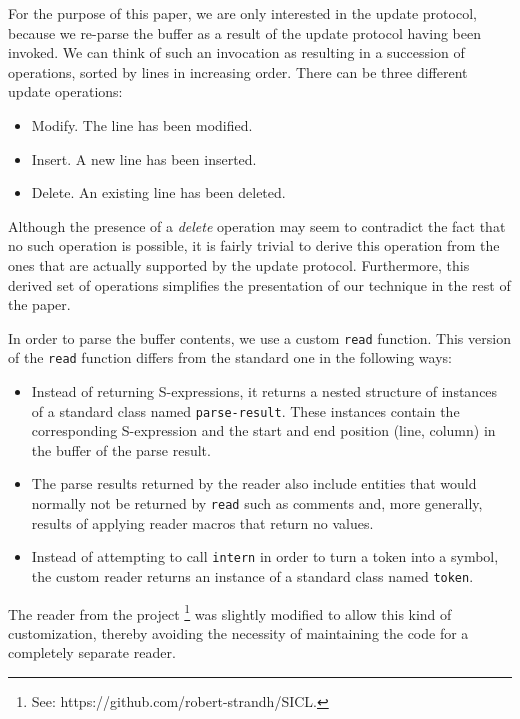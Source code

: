 For the purpose of this paper, we are only interested in the update
protocol, because we re-parse the buffer as a result of the update
protocol having been invoked.  We can think of such an invocation as
resulting in a succession of operations, sorted by lines in increasing
order.  There can be three different update operations:

\begin{itemize}
\item Modify.  The line has been modified.
\item Insert.  A new line has been inserted.
\item Delete.  An existing line has been deleted.
\end{itemize}

Although the presence of a \emph{delete} operation may seem to
contradict the fact that no such operation is possible, it is fairly
trivial to derive this operation from the ones that are actually
supported by the update protocol.  Furthermore, this derived set of
operations simplifies the presentation of our technique in the rest of
the paper.

In order to parse the buffer contents, we use a custom \texttt{read}
function.  This version of the \texttt{read} function differs from the
standard one in the following ways:

\begin{itemize}
\item Instead of returning S-expressions, it returns a nested
  structure of instances of a standard class named
  \texttt{parse-result}.  These instances contain the corresponding
  S-expression and the start and end position (line, column) in the
  buffer of the parse result.
\item The parse results returned by the reader also include entities
  that would normally not be returned by \texttt{read} such as
  comments and, more generally, results of applying reader macros
  that return no values.
\item Instead of attempting to call \texttt{intern} in order to turn a
  token into a symbol, the custom reader returns an instance of a
  standard class named \texttt{token}.
\end{itemize}

The reader from the \sicl{} project%
\footnote{See: https://github.com/robert-strandh/SICL.}  was slightly
modified to allow this kind of customization, thereby avoiding the
necessity of maintaining the code for a completely separate reader.

